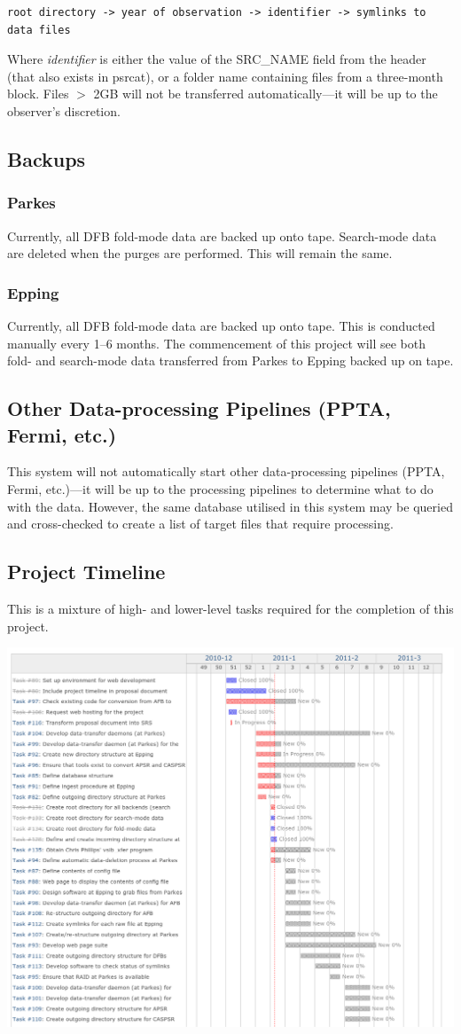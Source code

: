 \documentclass{article}
\begin{document}
\begin{verbatim}
root directory -> year of observation -> identifier -> symlinks to data files
\end{verbatim}

Where \emph{identifier} is either the value of the SRC\_NAME field from the header (that also exists in psrcat), or a folder name containing files from a three-month block. Files $>$ 2GB will not be transferred automatically---it will be up to the observer's discretion.

\subsection{Backups}
\subsubsection{Parkes}
Currently, all DFB fold-mode data are backed up onto tape. Search-mode data are deleted when the purges are performed. This will remain the same.

\subsubsection{Epping}
Currently, all DFB fold-mode data are backed up onto tape. This is conducted manually every 1--6 months. The commencement of this project will see both fold- and search-mode data transferred from Parkes to Epping backed up on tape.

\subsection{Other Data-processing Pipelines (PPTA, Fermi, etc.)}
This system will not automatically start other data-processing pipelines (PPTA, Fermi, etc.)---it will be up to the processing pipelines to determine what to do with the data. However, the same database utilised in this system may be queried and cross-checked to create a list of target files that require processing.

\subsection{Project Timeline}
This is a mixture of high- and lower-level tasks required for the completion of this project.

\includegraphics[scale=0.4]{timeline.png}
\end{document}
